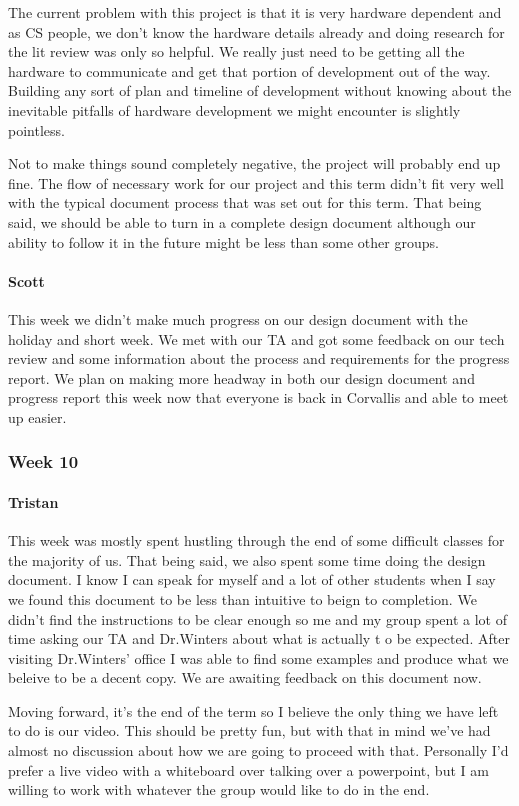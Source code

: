 \documentclass[onecolumn, draftclsnofoot,10pt, compsoc]{IEEEtran}
\begin{document}
The current problem with this project is that it is very hardware dependent and as CS people, we don't know the hardware details already and doing research for the lit review was only so helpful. We really just need to be getting all the hardware to communicate and get that portion of development out of the way. Building any sort of plan and timeline of development without knowing about the inevitable pitfalls of hardware development we might encounter is slightly pointless.

Not to make things sound completely negative, the project will probably end up fine. The flow of necessary work for our project and this term didn't fit very well with the typical document process that was set out for this term. That being said, we should be able to turn in a complete design document although our ability to follow it in the future might be less than some other groups.
\paragraph{Scott}
This week we didn't make much progress on our design document with the holiday and short week. We met with our TA and got some feedback on our tech review and some information about the process and requirements for the progress report. We plan on making more headway in both our design document and progress report this week now that everyone is back in Corvallis and able to meet up easier.
\subsubsection{Week 10}
\paragraph{Tristan}
This week was mostly spent hustling through the end of some difficult classes for the majority of us. That being said, we also spent some time doing the design document. I know I can speak for myself and a lot of other students when I say we found this document to be less than intuitive to beign to completion. We didn't find the instructions to be clear enough so me and my group spent a lot of time asking our TA and Dr.Winters about what is actually t o be expected. After visiting Dr.Winters' office I was able to find some examples and produce what we beleive to be a decent copy. We are awaiting feedback on this document now.

Moving forward, it's the end of the term so I believe the only thing we have left to do is our video. This should be pretty fun, but with that in mind we've had almost no discussion about how we are going to proceed with that. Personally I'd prefer a live video with a whiteboard over talking over a powerpoint, but I am willing to work with whatever the group would like to do in the end.
\end{document}
